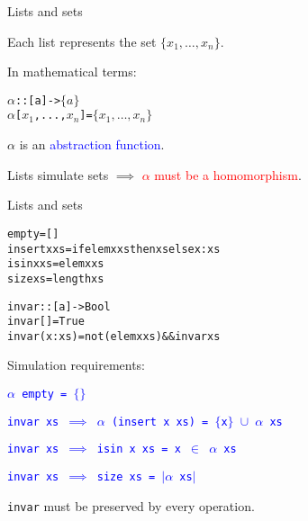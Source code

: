 \documentclass{beamer}
\def\code#1{\texttt{\frenchspacing#1}}
\begin{document}
\begin{frame}[fragile]{Lists and sets}

Each list \code{[$x_1$, ..., $x_n$]} represents the set $\{x_1, \dots, x_n\}$.

\pause

In mathematical terms:
\begin{alltt}
\(\alpha\) :: [a] -> \(\{a\}\)
\(\alpha\) [\(x_1\), ..., \(x_n\)]  = \(\{x_1, \dots, x_n\}\)
\end{alltt}

$\alpha$ is an \textcolor{blue}{abstraction function}.

\pause

\vspace{1cm}
Lists simulate sets $\implies$ \textcolor{red}{$\alpha$ must be a homomorphism}.

\end{frame}

\begin{frame}[fragile]{Lists and sets}

\begin{alltt}
empty = []
insert x xs = if elem x xs then xs else x:xs
isin x xs = elem x xs
size xs = length xs\pause

invar :: [a] -> Bool\pause
invar []     = True\pause
invar (x:xs) = not (elem x xs) && invar xs
\end{alltt}

Simulation requirements: \par\pause
\textcolor{blue}{\code{$\alpha$ empty = $\{\}$}} \par\pause
\textcolor{blue}{\code{invar xs $\implies$ $\alpha$ (insert x xs) = $\{$x$\}$ $\cup$ $\alpha$ xs}} \par\pause
\textcolor{blue}{\code{invar xs $\implies$ isin x xs = x $\in$ $\alpha$ xs}} \par\pause
\textcolor{blue}{\code{invar xs $\implies$ size xs = $\lvert \alpha$ xs$\rvert$}}

\pause

\begin{alertblock}{\centering \code{invar} must be preserved by every operation.}
\end{alertblock}

\end{frame}
\end{document}
